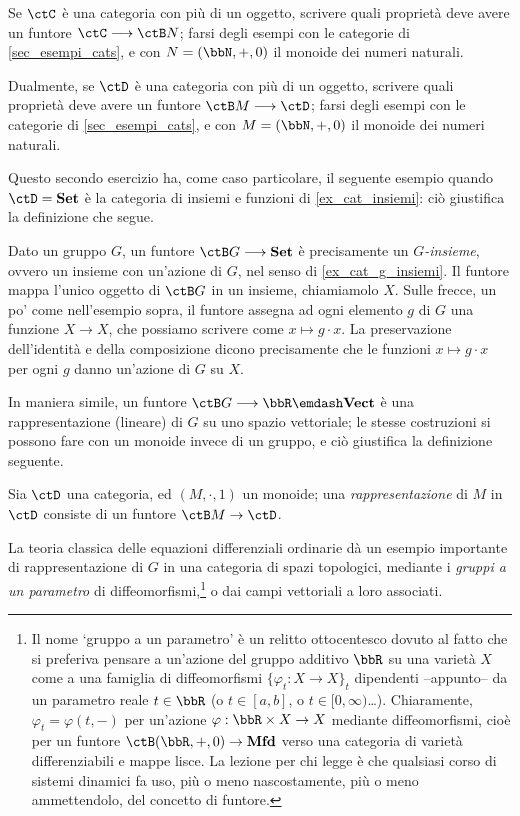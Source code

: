 Se \(\ctC\) è una categoria con più di un oggetto, scrivere quali proprietà deve avere un funtore \(\ctC \fun \ctB N\); farsi degli esempi con le categorie di \ref{sec_esempi_cats}, e con \(N=(\bbN,+,0)\) il monoide dei numeri naturali.

Dualmente, se \(\ctD\) è una categoria con più di un oggetto, scrivere quali proprietà deve avere un funtore \(\ctB M \fun \ctD\); farsi degli esempi con le categorie di \ref{sec_esempi_cats}, e con \(M = (\bbN,+,0)\) il monoide dei numeri naturali.

Questo secondo esercizio ha, come caso particolare, il seguente esempio quando \(\ctD=\ctSet\) è la categoria di insiemi e funzioni di \ref{ex_cat_insiemi}: ciò giustifica la definizione che segue.
\begin{example}\label{exa_azioni_funtori}
	Dato un gruppo \(G\), un funtore \(\ctB G\fun\ctSet\) è precisamente un \emph{\(G\)-insieme}, ovvero un insieme con un'azione di \(G\), nel senso di \ref{ex_cat_g_insiemi}.
	Il funtore mappa l'unico oggetto di \(\ctB G\) in un insieme, chiamiamolo \(X\).
	Sulle frecce, un po' come nell'esempio sopra, il funtore assegna ad ogni elemento \(g\) di \(G\) una funzione \(X\to X\), che possiamo scrivere come \(x\mapsto g\cdot x\).
	La preservazione dell'identità e della composizione dicono precisamente che le funzioni \(x\mapsto g\cdot x\) per ogni \(g\) danno un'azione di \(G\) su \(X\).

\end{example}
In maniera simile, un funtore \(\ctB G\fun\bbR\emdash\ctVect\) è una rappresentazione (lineare) di \(G\) su uno spazio vettoriale; le stesse costruzioni si possono fare con un monoide invece di un gruppo, e ciò giustifica la definizione seguente.
\begin{definition}[Rappresentazione di \(M\)]
	Sia \(\ctD\) una categoria, ed \((M,\cdot,1)\) un monoide; una \emph{rappresentazione} di \(M\) in \(\ctD\) consiste di un funtore \(\ctB M \to \ctD\).
\end{definition}
La teoria classica delle equazioni differenziali ordinarie dà un esempio importante di rappresentazione di \(G\) in una categoria di spazi topologici, mediante i \emph{gruppi a un parametro} di diffeomorfismi,\footnote{Il nome `gruppo a un parametro' è un relitto ottocentesco dovuto al fatto che si preferiva pensare a un'azione del gruppo additivo \(\bbR\) su una varietà \(X\) come a una famiglia di diffeomorfismi \(\{\varphi_t : X\to X\}_t\) dipendenti --appunto-- da un parametro reale \(t\in\bbR\) (o \(t\in [a,b]\), o \(t\in [0,\infty)\)\dots). Chiaramente, \(\varphi_t = \varphi(t,-)\) per un'azione \(\varphi : \bbR\times X\to X\) mediante diffeomorfismi, cioè per un funtore \(\ctB(\bbR,+,0)\to\cate{Mfd}\) verso una categoria di varietà differenziabili e mappe lisce. La lezione per chi legge è che qualsiasi corso di sistemi dinamici fa uso, più o meno nascostamente, più o meno ammettendolo, del concetto di funtore.} o dai campi vettoriali a loro associati.
